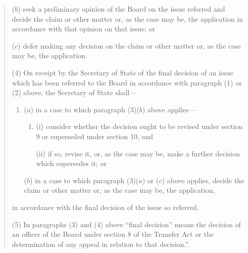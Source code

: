 \documentclass[12pt,a4paper]{article}
\begin{document}
\begin{quotation}
\begin{enumerate}
($b$) seek a preliminary opinion of the Board on the issue referred and decide the claim or other matter or, as the case may be, the application in accordance with that opinion on that issue; or

($c$) defer making any decision on the claim or other matter or, as the case may be, the application.
\end{enumerate}

(4) On receipt by the Secretary of State of the final decision of an issue which has been referred to the Board in accordance with paragraph (1) or (2) above, the Secretary of State shall—
\begin{enumerate}\item[]
($a$) in a case to which paragraph (3)($b$) above applies—
\begin{enumerate}\item[]
(i) consider whether the decision ought to be revised under section 9 or superseded under section 10, and

(ii) if so, revise it, or, as the case may be, make a further decision which supersedes it; or
\end{enumerate}

($b$) in a case to which paragraph (3)($a$) or ($c$) above applies, decide the claim or other matter or, as the case may be, the application,
\end{enumerate}
in accordance with the final decision of the issue so referred.

(5) In paragraphs (3) and (4) above “final decision” means the decision of an officer of the Board under section 8 of the Transfer Act or the determination of any appeal in relation to that decision.”.
\end{quotation}
\end{document}
